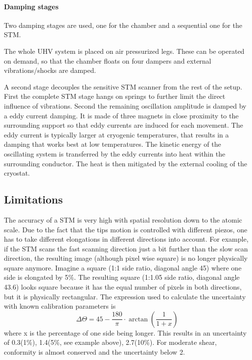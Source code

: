 \paragraph{Damping stages}
Two damping stages are used, one for the chamber and a sequential one for the STM.

The whole UHV system is placed on air pressurized legs. These can be operated on demand, so that the chamber floats on four dampers and external vibrations/shocks are damped. 

A second stage decouples the sensitive STM scanner from the rest of the setup. First the complete STM stage hangs on springs to further limit the direct influence of vibrations. Second the remaining oscillation amplitude is damped by a eddy current damping. It is made of three magnets in close proximity to the surrounding support so that eddy currents are induced for each movement. The eddy current is typically larger at cryogenic temperatures, that results in a damping that works best at low temperatures. The kinetic energy of the oscillating system is transferred by the eddy currents into heat within the surrounding conductor. The heat is then mitigated by the external cooling of the cryostat.

\subsection{Limitations}The accuracy of a STM is very high with spatial resolution down to the atomic scale. Due to the fact that the tips motion is controlled with different piezos, one has to take different elongations in different directions into account. For example, if the STM scans the fast scanning direction just a bit further than the slow scan direction, the resulting image (although pixel wise square) is no longer physically square anymore. Imagine a square (1:1 side ratio, diagonal angle 45\textdegree) where one side is elongated by 5\%. The resulting square (1:1.05 side ratio, diagonal angle 43.6\textdegree) looks square because it has the equal number of pixels in both directions, but it is physically rectangular. The expression used to calculate the uncertainty with known calibration parameters is
$$\Delta \Theta = 45 - \frac{180}{\pi}\cdot\arctan(\frac{1}{1+x})$$ where x is the percentage of one side being longer. This results in an uncertainty of 0.3\textdegree(1\%), 1.4\textdegree(5\%, see example above), 2.7\textdegree(10\%). For moderate shear, conformity is almost conserved and the uncertainty below 2\textdegree.

